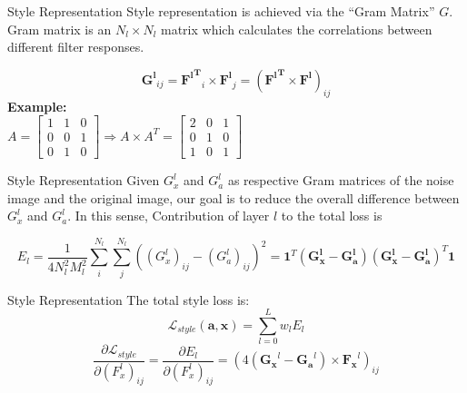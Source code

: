 \documentclass{beamer}
\begin{document}
\begin{frame}{Style Representation}
Style representation is achieved via the ``Gram Matrix'' $G$. Gram matrix is
an $N_l \times N_l$ matrix which calculates the correlations between
different filter responses.

\begin{equation}
    \mathbf{G^l}_{ij} = \mathbf{{F^l}^T}_i \times \mathbf{F^l}_j
    = (\mathbf{{F^l}^T} \times \mathbf{F^l})_{ij}
\end{equation}
\bigskip
    \textbf{Example:} \\
$A = \begin{bmatrix}
    1       & 1 & 0 \\
    0       & 0 & 1 \\
    0       & 1 & 0 
\end{bmatrix} 
\Rightarrow A \times A^T = \begin{bmatrix}
    2       & 0 & 1 \\
    0       & 1 & 0 \\
    1       & 0 & 1 
\end{bmatrix}$

\end{frame}



\begin{frame}{Style Representation}
Given $G_x^l$ and $G_a^l$ as respective Gram matrices of the noise image and
the original image, our goal is to reduce the overall difference between
$G_x^l$ and $G_a^l$. In this sense, Contribution of layer $l$ to the total
loss is

\begin{equation}
    E_l = \frac{1}{4N_l^2M_l^2} \sum_{i}^{N_l}\sum_{j}^{N_l}{((G^l_x)_{ij} - (G_a^l)_{ij})^2}
    = \mathbf{1}^T(\mathbf{G^l_x} - \mathbf{G^l_a})(\mathbf{G^l_x} - \mathbf{G^l_a})^T \mathbf{1}
\end{equation}

\end{frame}



\begin{frame}{Style Representation}
The total style loss is:
\begin{equation}
    \mathcal{L}_{style}(\mathbf{a}, \mathbf{x}) = \sum_{l=0}^L {w_l E_l }
\end{equation}
\begin{equation}
    \frac{\partial \mathcal{L}_{style}}{\partial (F_x^l)_{ij}} = \frac{\partial E_l}{\partial (F^l_x)_{ij}} =
    (4(\mathbf{G_x}^l - \mathbf{G_a}^l) \times \mathbf{F_x}^l)_{ij}
\end{equation}
\end{frame}
\end{document}
